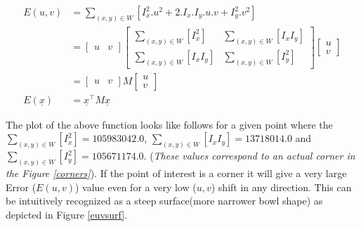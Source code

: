 \documentclass[a4paper,11pt]{article}%
\begin{document}
\begin{equation}
	 \begin{split}
		 	E(u,v) &= \sum_{(x,y) \in W}[I_{x}^{2}.u^{2}+2.I_{x}.I_{y}.u.v + I_{y}^{2}.v^{2}]\\
		 	&= \begin{bmatrix} u & v \end{bmatrix}
		 	 \begin{bmatrix}
		 	 	\sum_{(x,y) \in W}[I_x ^2 ]& \sum_{(x,y) \in W}[I_x I_y]  \\ \sum_{(x,y) \in W}[I_x I_y]& \sum_{(x,y) \in W}[I_y ^2 ]
	 	 	\end{bmatrix}
		 	\begin{bmatrix} u \\ v \end{bmatrix}\\
		 	&=\begin{bmatrix} u & v \end{bmatrix}M\begin{bmatrix} u \\ v \end{bmatrix}\\
		 	E(\underline{x})&= \underline{x}^\top M \underline{x}
	 \end{split}
  \label{euv}
 \end{equation}

The plot of the above function looks like follows for a given point where the $\sum_{(x,y) \in W}[I_x ^2 ]= 105983042.0$, $\sum_{(x,y) \in W}[I_x I_y]=13718014.0$ and $\sum_{(x,y) \in W}[I_y ^2 ]=105671174.0$\cite{cv}. (\textit{These values correspond to an actual corner in the Figure \ref{corners}}). If the point of interest is a corner it will give a very large Error ($E(u,v)$) value even for a very low ($u,v$) shift in any direction. This can be intuitively recognized as a steep surface(more narrower bowl shape) as depicted in Figure \ref{euvsurf}.
\end{document}
